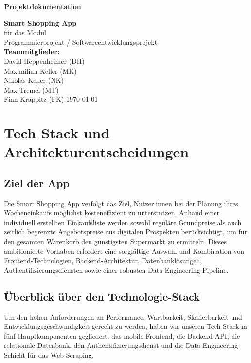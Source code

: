 \documentclass[12pt, a4paper]{report} %
\begin{document}
\begin{titlepage}
    \centering
    \vspace*{4cm}
    {\LARGE\bfseries Projektdokumentation \par}
    \vspace{1.5cm}
    {\Large \textbf{Smart Shopping App} \\[3mm]}
    \vspace{1cm}
    {\large für das Modul\\
      Programmierprojekt / Softwareentwicklungsprojekt\\}
    \vspace{1.5cm}
    {\large
      \textbf{Teammitglieder:}\\[5mm]
      David Heppenheimer (DH)\\
      Maximilian Keller (MK)\\
      Nikolas Keller (NK)\\
      Max Tremel (MT)\\
      Finn Krappitz (FK)
    }
    \vfill
    {\large \today}
\end{titlepage}

\tableofcontents
\cleardoublepage
\chapter{Tech Stack und Architekturentscheidungen}
\label{chap:tech_stack}

\section{Ziel der App}
Die Smart Shopping App verfolgt das Ziel, Nutzer:innen bei der Planung ihres Wocheneinkaufs möglichst kosteneffizient zu unterstützen. Anhand einer individuell erstellten Einkaufsliste werden sowohl reguläre Grundpreise als auch zeitlich begrenzte Angebots­preise aus digitalen Prospekten berücksichtigt, um für den gesamten Warenkorb den günstigsten Supermarkt zu ermitteln. Dieses ambitionierte Vorhaben erfordert eine sorgfältige Auswahl und Kombination von Frontend-Technologien, Backend-Architektur, Datenbanklösungen, Authentifizierungsdiensten sowie einer robusten Data-Engineering-Pipeline.

\section{Überblick über den Technologie-Stack}
Um den hohen Anforderungen an Performance, Wartbarkeit, Skalierbarkeit und Entwicklungsgeschwindigkeit gerecht zu werden, haben wir unseren Tech Stack in fünf Hauptkomponenten gegliedert: das mobile Frontend, die Backend-API, die relationale Datenbank, den Authentifizierungsdienst und die Data-Engineering-Schicht für das Web Scraping.
\end{document}

